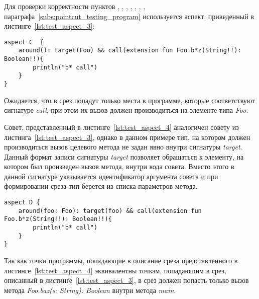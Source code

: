 Для проверки корректности пунктов \quotes{\ref{list:method_name_check}},
\quotes{\ref{list:class_name_check}},
\quotes{\ref{list:method_params_check}},
\quotes{\ref{list:method_modifiers_check}},
\quotes{\ref{list:method_extension_check}},
\quotes{\ref{list:method_return_value_check}},
\quotes{\ref{list:target_check}},
\quotes{\ref{list:logic_operations_check}} параграфа~\ref{subs:pointcut_testing_program} используется аспект, приведенный в листинге~\ref{lst:test_aspect_3}:
\begin{lstlisting}[style={java}, label={lst:test_aspect_3},
  caption={Пример тестового аспекта}]
aspect C  {
    around(): target(Foo) && call(extension fun Foo.b*z(String!!): Boolean!!){
        println("b* call")
    }
}
\end{lstlisting}

Ожидается, что в срез попадут только места в программе, которые соответствуют сигнатуре \textit{call}, при этом их вызов должен производиться на элементе типа \textit{Foo}.

Совет, представленный в листинге~\ref{lst:test_aspect_4} аналогичен совету из листинга~\ref{lst:test_aspect_3}, однако в данном примере тип, на котором должен производиться вызов целевого метода не задан явно внутри сигнатуры \textit{target}.
Данный формат записи сигнатуры \textit{target} позволяет обращаться к элементу, на котором был произведен вызов метода, внутри кода совета.
Вместо этого в данной сигнатуре указывается идентификатор аргумента совета и при формировании среза тип берется из списка параметров метода.
\begin{lstlisting}[style={java}, label={lst:test_aspect_4},
  caption={Пример тестового аспекта}]
aspect D {
    around(foo: Foo): target(foo) && call(extension fun Foo.b*z(String!!): Boolean!!){
        println("b* call")
    }
}
\end{lstlisting}
Так как точки программы, попадающие в описание среза представленного в листинге~\ref{lst:test_aspect_4} эквивалентны точкам, попадающим в срез, описанный в листинге~\ref{lst:test_aspect_3}, в срез должен попасть только вызов метода \textit{Foo.baz(s: String): Boolean} внутри метода \textit{main}.

